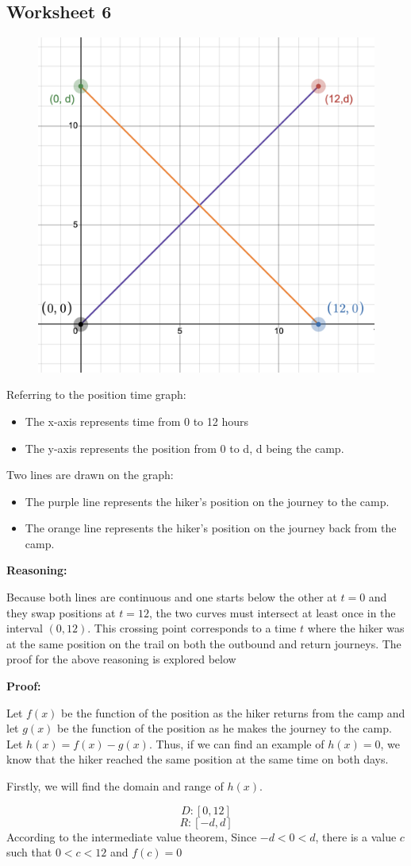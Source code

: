 \documentclass{article}
\begin{document}
\subsection*{Worksheet 6}
\begin{figure}[h!]
    \centering
    \includegraphics[width=0.5\linewidth]{PT.png}
\end{figure}
Referring to the position time graph:
\begin{itemize}
    \item The x-axis represents time from 0 to 12 hours
    \item The y-axis represents the position from 0 to d, d being the camp.
\end{itemize}

Two lines are drawn on the graph:
\begin{itemize}
    \item The purple line represents the hiker's position on the journey to the camp.
    \item The orange line represents the hiker's position on the journey back from the camp.
\end{itemize}

\noindent\textbf{Reasoning:}

Because both lines are continuous and one starts below the other at \( t = 0 \) and they swap positions at \( t = 12 \), the two curves must intersect at least once in the interval \( (0, 12) \). This crossing point corresponds to a time \( t \) where the hiker was at the same position on the trail on both the outbound and return journeys. The proof for the above reasoning is explored below 

\noindent\textbf{Proof:}

Let $f(x)$ be the function of the position as the hiker returns from the camp and let $g(x)$ be the function of the position as he makes the journey to the camp. Let $h(x) = f(x) - g(x)$. Thus, if we can find an example of $h(x) = 0$, we know that the hiker reached the same position at the same time on both days.

Firstly, we will find the domain and range of $h(x)$. 

\[
D: [0, 12]
\]
\[
R: [-d,d]
\]
According to the intermediate value theorem,
Since $-d < 0 < d$, there is a value $c$ such that $0 < c < 12$ and $f(c) = 0$
\end{document}
